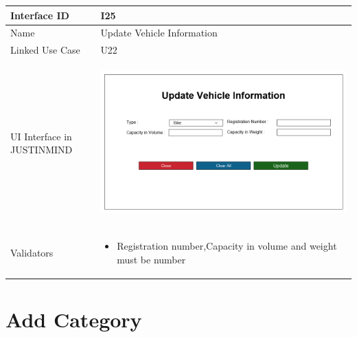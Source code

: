 \documentclass[12pt,a4paper]{report}
\begin{document}
\begin{tabular}{ | m{3cm} | m{12cm}| } \hline

Interface ID & I25  \\\hline

Name  &  Update Vehicle Information \\ \hline

Linked Use Case & U22	 \\ \hline

UI Interface in JUSTINMIND & \begin{center} \includegraphics[scale=0.3]{./User Interface/UI-024 Update Vehicle Information.png}\end{center}  \\ \hline

Validators & 
\begin{itemize}
\item   Registration number,Capacity in volume and weight must be number
\end{itemize}
\\ \hline
\end{tabular} 
\section{Add Category}
\end{document}
